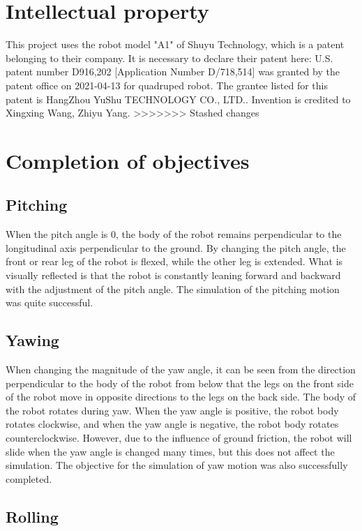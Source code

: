 \section{Intellectual property}
This project uses the robot model "A1" of Shuyu Technology, which is a patent belonging to their company. It is necessary to declare their patent here: U.S. patent number D916,202 [Application Number D/718,514] was granted by the patent office on 2021-04-13 for quadruped robot. The grantee listed for this patent is HangZhou YuShu TECHNOLOGY CO., LTD.. Invention is credited to Xingxing Wang, Zhiyu Yang.
>>>>>>> Stashed changes

\section{Completion of objectives}

\subsection{Pitching}

When the pitch angle is 0, the body of the robot remains perpendicular to the longitudinal axis perpendicular to the ground. By changing the pitch angle, the front or rear leg of the robot is flexed, while the other leg is extended. What is visually reflected is that the robot is constantly leaning forward and backward with the adjustment of the pitch angle. The simulation of the pitching motion was quite successful.

\subsection{Yawing}

When changing the magnitude of the yaw angle, it can be seen from the direction perpendicular to the body of the robot from below that the legs on the front side of the robot move in opposite directions to the legs on the back side. The body of the robot rotates during yaw. When the yaw angle is positive, the robot body rotates clockwise, and when the yaw angle is negative, the robot body rotates counterclockwise. However, due to the influence of ground friction, the robot will slide when the yaw angle is changed many times, but this does not affect the simulation. The objective for the simulation of yaw motion was also successfully completed.

\subsection{Rolling}

